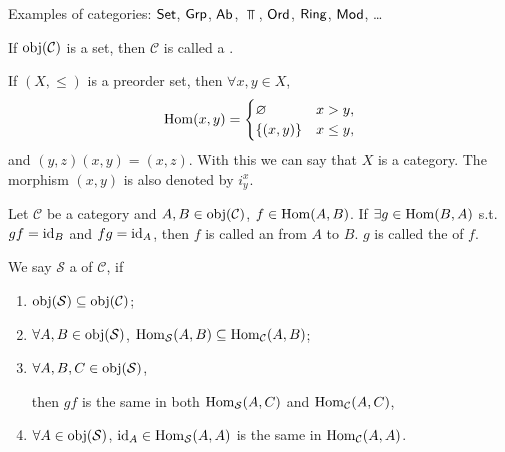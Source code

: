 \documentclass[openany, a5paper]{book}
\begin{document}
\begin{center}\end{center}

Examples of categories: $\operatorname{\mathsf{Set}}$, $\operatorname{\mathsf{Grp}}$, $\operatorname{\mathsf{Ab}}$, $\Top$, $\operatorname{\mathsf{Ord}}$, $\operatorname{\mathsf{Ring}}$, $\operatorname{\mathsf{Mod}}$, \ldots

If $\operatorname{obj}(\mathcal C)$ is a set, 
then $\mathcal C$ is called a .

If $(X, \leq)$ is a preorder set, then $\forall x, y \in X$, 
\begin{equation}\label{eq: preorder morphism}
	\operatorname{Hom}(x, y) = 
	\begin{cases}
		\varnothing & x > y,
		\\
		\{(x, y)\} & x \leq y,
	\end{cases}
\end{equation}
and $(y, z) (x, y) = (x, z)$.
With this we can say that $X$ is a category.
The morphism $(x, y)$ is also denoted by $i^x_y$.

\begin{definition}[Isomorphism]
	Let $\mathcal C$ be a category and $A, B \in \operatorname{obj}(\mathcal C)$, $f \in \operatorname{Hom}(A, B)$.
	If $\exists g \in \operatorname{Hom}(B, A)$ s.t.\ $gf = \operatorname{id}_B$ and $fg = \operatorname{id}_A$, then $f$ is called an  from $A$ to $B$. 
	$g$ is called the  of $f$.
\end{definition}

\begin{definition}[Subcategory]
	We say $\mathcal S$ a  of $\mathcal C$, if
	\begin{enumerate}[label=(\roman*)]
		\item $\operatorname{obj}(\mathcal S) \subseteq \operatorname{obj}(\mathcal C)$;
		\item $\forall A, B \in \operatorname{obj}(\mathcal S)$, $\operatorname{Hom}_{\mathcal S}(A, B) \subseteq \operatorname{Hom}_{\mathcal C}(A, B)$;
		\item $\forall A, B, C \in \operatorname{obj}(\mathcal S)$, 
		\begin{center}
		\end{center}
		then $gf$ is the same in both $\operatorname{Hom}_{\mathcal S}(A, C)$ and $\operatorname{Hom}_{\mathcal C}(A, C)$,
		\item $\forall A \in \operatorname{obj}(\mathcal S)$, 
		$\operatorname{id}_A \in \operatorname{Hom}_{\mathcal S}(A, A)$ is the same in $\operatorname{Hom}_{\mathcal C}(A, A)$.
	\end{enumerate}
\end{definition}
\end{document}
